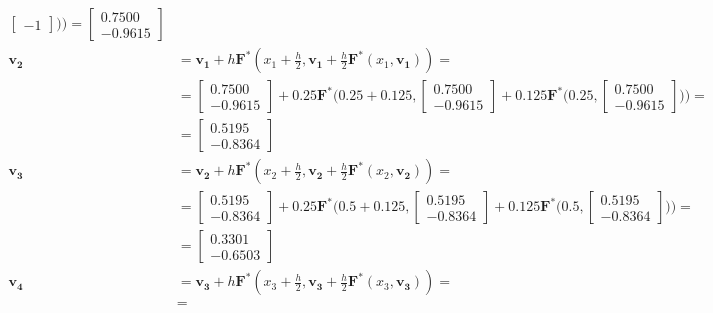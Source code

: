 \documentclass[a4paper, 12pt]{article}
\begin{document}
\begin{enumerate}
\begin{align*}
\begin{bmatrix}
					-1
				\end{bmatrix}\bigg)\bigg)=
				\begin{bmatrix}
					0.7500\\
					-0.9615
				\end{bmatrix}\\
				\mathbf{v_2}&=\mathbf{v_1} + h\mathbf{F^*}(x_1 + \frac{h}{2}, \mathbf{v_1}+\frac{h}{2}\mathbf{F^*}(x_1,\mathbf{v_1}))=\\&=
				\begin{bmatrix}
					0.7500\\
					-0.9615
				\end{bmatrix} + 0.25\mathbf{F^*}\bigg(0.25 + 0.125, 
				\begin{bmatrix}
					0.7500\\
					-0.9615
				\end{bmatrix} + 0.125\mathbf{F^*}\bigg(0.25, 
				\begin{bmatrix}
					0.7500\\
					-0.9615
				\end{bmatrix}\bigg)\bigg)=\\&=
				\begin{bmatrix}
					0.5195\\
					-0.8364
				\end{bmatrix}\\
				\mathbf{v_3}&=\mathbf{v_2} + h\mathbf{F^*}(x_2 + \frac{h}{2}, \mathbf{v_2}+\frac{h}{2}\mathbf{F^*}(x_2,\mathbf{v_2}))=\\&=
				\begin{bmatrix}
					0.5195\\
					-0.8364
				\end{bmatrix} + 0.25\mathbf{F^*}\bigg(0.5 + 0.125, 
				\begin{bmatrix}
					0.5195\\
					-0.8364
				\end{bmatrix} + 0.125\mathbf{F^*}\bigg(0.5, 
				\begin{bmatrix}
					0.5195\\
					-0.8364
				\end{bmatrix}\bigg)\bigg)=\\&=
				\begin{bmatrix}
					0.3301\\
					-0.6503
				\end{bmatrix}\\
				\mathbf{v_4}&=\mathbf{v_3} + h\mathbf{F^*}(x_3 + \frac{h}{2}, \mathbf{v_3}+\frac{h}{2}\mathbf{F^*}(x_3,\mathbf{v_3}))=\\&=

\end{align*}
\end{enumerate}
\end{document}
